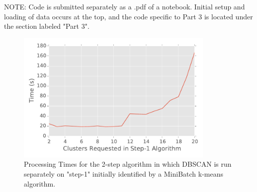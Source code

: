 \documentclass[12pt]{article}
\begin{document}
	NOTE: Code is submitted separately as a .pdf of a notebook. Initial setup and loading of data occurs at the top, and the code specific to Part 3 is located under the section labeled "Part 3".
	
	\begin{figure}[H]
		\centering
		\includegraphics[width=3.75in]{2steptimes}
		\caption{Processing Times for the 2-step algorithm in which DBSCAN is run separately on "step-1" initially identified by a MiniBatch k-means algorithm.} \label{times_2step}
	\end{figure}
	
\end{document}
